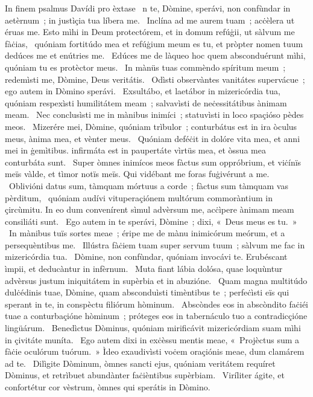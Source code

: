 { In finem psalmus Davídi pro èxtase}
{%
~n te, Dòmine, sperávi, non confùndar in aetèrnum~; in justìçia tua líbera me. 
~Inclína ad me aurem tuam~; acċèlera ut éruas me. Esto mìhi in Deum protectórem, et in domum refúġii, ut sàlvum me fàċias, 
~quóniam fortitúdo mea et refúġium meum es tu, et pròpter nomen tuum dedúces me et enútries me. 
~Edúces me de làqueo hoc quem absconduérunt mìhi, quóniam tu es protèctor meus. 
~In mànüs tuas commèndo spíritum meum~; redemìsti me, Dòmine, Deus veritátis. 
~Odìsti observàntes vanitátes supervácue~; ego autem in Dòmino sperávi. 
~Exsultábo, et laetábor in mizericórdia tua, quóniam respexìsti humilitátem meam~; salvavìsti de neċessitátibus ànimam meam. 
~Nec conclusìsti me in mànibus inimíci~; statuvìsti in loco spaçióso pèdes meos. 
~Mizerére mei, Dòmine, quóniam trìbulor~; conturbátus est in ira òculus meus, ànima mea, et vènter meus. 
~Quóniam deféċit in dolóre vita mea, et anni mei in ġemìtibus. infirmáta est in paupertáte vìrtüs mea, et òssua mea conturbáta sunt. 
~Super òmnes inimícos meos fàctus sum oppróbrium, et viċínïs meïs vàlde, et tìmor notïs meïs. Qui vidébant me foras fuġivérunt a me. 
~Oblivióni datus sum, tàmquam mórtuus a corde~; fàctus sum tàmquam vas pèrditum, 
~quóniam audívi vituperaçiónem multórum commoràntium in çircùmitu. In eo dum convenírent sìmul advèrsum me, acċìpere ànimam meam consiliáti sunt. 
~Ego autem in te sperávi, Dòmine~; dixi, «~Deus meus es tu.~»
~In mànibus tuïs sortes meae~; éripe me de mànu inimicórum meórum, et a persequèntibus me. 
~Illústra fàċiem tuam super servum tuum~; sàlvum me fac in mizericórdia tua. 
~Dòmine, non confùndar, quóniam invocávi te. Erubéscant ìmpii, et deducàntur in infèrnum. 
~Muta fiant lábia dolósa, quae loquùntur advèrsus justum iniquitátem in supèrbia et in abuzióne. 
~Quam magna multitúdo dulċédinis tuae, Dòmine, quam absconduìsti timèntibus te~; perfeċìsti eïs qui sperant in te, in conspèctu filiórum hòminum. 
~Abscòndes eos in abscòndito faċiéi tuae a conturbaçióne hòminum~; próteges eos in tabernáculo tuo a contradicçióne lingüárum. 
~Benedìctus Dòminus, quóniam mirificávit mizericórdiam suam mìhi in çivitáte muníta. 
~Ego autem dixi in exċèssu mentis meae, «~Projèctus sum a fàċie oculórum tuórum.~» Ìdeo exaudivìsti voċem oraçiónis meae, dum clamárem ad te. 
~Dilìgite Dòminum, òmnes sancti ejus, quóniam veritátem requíret Dòminus, et retrìbuet abundànter faċièntibus supèrbiam. 
~Viríliter ágite, et confortétur cor vèstrum, òmnes qui sperátis in Dòmino. 
}
